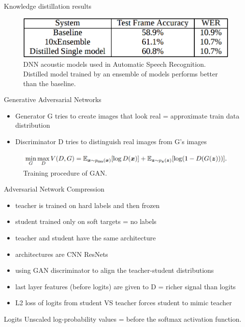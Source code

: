 \documentclass{beamer}
\begin{document}
\begin{frame}{Knowledge distillation results}

\begin{figure}[h]
\includegraphics[width=\textwidth]{img/distilled_result}
\caption{DNN acoustic models used in Automatic Speech Recognition. Distilled model trained by an ensemble of models performs better than the baseline. \cite{cit:distill}}
\end{figure}

\end{frame}
\begin{frame}{Generative Adversarial Networks}

\begin{itemize}
\item Generator G tries to create images that look real = approximate train data distribution
\item Discriminator D tries to distinguish real images from G's images
\end{itemize}


\begin{figure}[h]
\includegraphics[width=\textwidth]{img/GAN}
\caption{Training procedure of GAN. \cite{cit:gan}}
\end{figure}

\end{frame}
\begin{frame}{Adversarial Network Compression}

\begin{itemize}
\item teacher is trained on hard labels and then frozen
\item student trained only on soft targets = no labels
\item teacher and student have the same architecture
\item architectures are CNN ResNets
\item using GAN discriminator to align the teacher-student distributions
\item last layer features (before logits) are given to D = richer signal than logits
\item L2 loss of logits from student VS teacher forces student to mimic teacher 
\end{itemize}

\begin{block}{Logits}
Unscaled log-probability values = before the softmax
activation function.
\end{block}


\end{frame}
\end{document}
